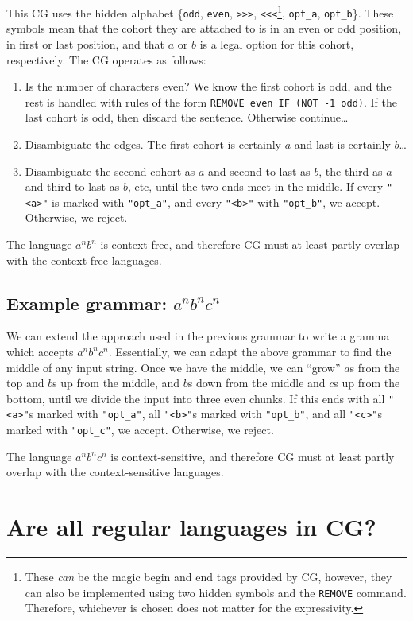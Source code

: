 \documentclass[11pt]{article}
\def\t#1{\texttt{#1}}
\begin{document}
This CG uses the hidden alphabet \{\t{odd}, \t{even}, \t{>>>}, \t{<<<}\footnote{
  These \emph{can} be the magic begin and end tags provided by CG, however, they
  can also be implemented using two hidden symbols and the \t{REMOVE} command.
  Therefore, whichever is chosen does not matter for the expressivity.
}, \t{opt\_a}, \t{opt\_b}\}.
These symbols mean that the cohort they are attached to is in an even or odd
position, in first or last position, and that $a$ or $b$ is a legal option for
this cohort, respectively. 
The CG operates as follows:
\begin{enumerate}
\item
  Is the number of characters even? We know the first cohort is odd, and the
  rest is handled with rules of the form \t{REMOVE even IF (NOT -1 odd)}. If the
  last cohort is odd, then discard the sentence. Otherwise continue\dots
\item
  Disambiguate the edges. The first cohort is certainly $a$ and last is
  certainly $b$\dots
\item
  Disambiguate the second cohort as $a$ and second-to-last as $b$, the third as
  $a$ and third-to-last as $b$, etc, until the two ends meet in the middle. If
  every \t{"<a>"} is marked with \t{"opt\_a"}, and every \t{"<b>"} with
  \t{"opt\_b"}, we accept. Otherwise, we reject.  
\end{enumerate}
The language $a^nb^n$ is context-free, and therefore CG must at least partly
overlap with the context-free languages.

\subsection{Example grammar: $a^nb^nc^n$}

We can extend the approach used in the previous grammar to write a gramma which
accepts $a^nb^nc^n$. Essentially, we can adapt the above grammar to find the
middle of any input string. Once we have the middle, we can ``grow'' $a$s from
the top and $b$s up from the middle, and $b$s down from the middle and $c$s up
from the bottom, until we divide the input into three even chunks.
If this ends with all \t{"<a>"}s marked with \t{"opt\_a"}, all \t{"<b>"}s marked
with \t{"opt\_b"}, and all \t{"<c>"}s marked with \t{"opt\_c"}, we accept.
Otherwise, we reject.

The language $a^nb^nc^n$ is context-sensitive, and therefore CG must at least
partly overlap with the context-sensitive languages. 


\section{Are all regular languages in CG?}
\end{document}
